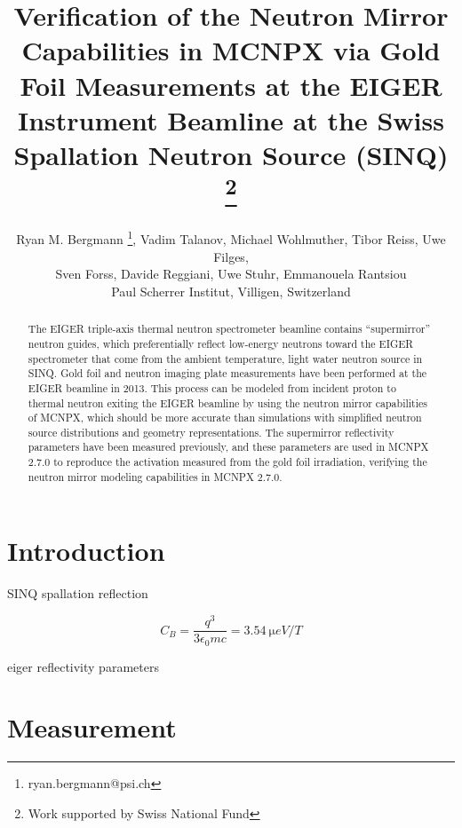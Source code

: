\documentclass[a4paper,
              ]{jacow}
\begin{document}
\title{Verification of the Neutron Mirror Capabilities in MCNPX via Gold Foil Measurements at the EIGER Instrument Beamline at the Swiss Spallation Neutron Source (SINQ) \thanks{Work supported by Swiss National Fund}}

\author{Ryan M. Bergmann \thanks{ryan.bergmann@psi.ch}, Vadim Talanov, Michael Wohlmuther, Tibor Reiss, Uwe Filges, \\ Sven Forss, Davide Reggiani, Uwe Stuhr, Emmanouela Rantsiou\\ Paul Scherrer Institut, Villigen, Switzerland\\}

\maketitle

%
\begin{abstract}
   The EIGER triple-axis thermal neutron spectrometer beamline contains “supermirror” neutron guides, which preferentially reflect low-energy neutrons toward the EIGER spectrometer that come from the ambient temperature, light water neutron source in SINQ.  Gold foil and neutron imaging plate measurements have been performed at the EIGER beamline in 2013.  This process can be modeled from incident proton to thermal neutron exiting the EIGER beamline by using the neutron mirror capabilities of MCNPX, which should be more accurate than simulations with simplified neutron source distributions and geometry representations.  The supermirror reflectivity parameters have been measured previously, and these parameters are used in MCNPX 2.7.0 to reproduce the activation measured from the gold foil irradiation, verifying the neutron mirror modeling capabilities in MCNPX 2.7.0.
\end{abstract}


\section{Introduction}

SINQ spallation
reflection

\begin{equation}\label{eq:units}
    C_B=\frac{q^3}{3\epsilon_{0} mc}=\SI{3.54}{\micro eV/T}
\end{equation}

eiger reflectivity parameters


\section{Measurement}
\end{document}
